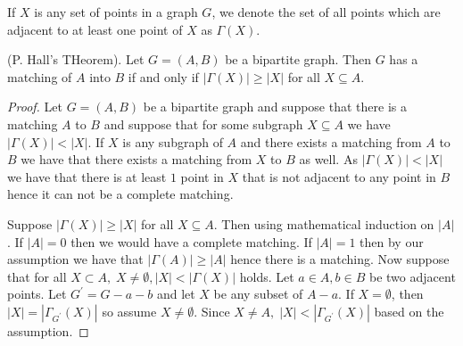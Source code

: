 \documentclass[12pt]{article}
\newenvironment{theorem}[2][Theorem]{\begin{trivlist}
\item[\hskip \labelsep {\bfseries #1}\hskip \labelsep {\bfseries #2.}]}{\end{trivlist}}
\begin{document}
If $X$ is any set of points in a graph $G$, we denote the set of all points which are adjacent to at least one point of $X$ as $\Gamma(X)$.

\begin{theorem}
    {1.1.3.}
    (P. Hall's THeorem). Let $G=(A,B)$ be a bipartite graph. Then $G$ has a matching of $A$ into $B$ if and only if $|\Gamma(X)|\geq |X|$ for all $X \subseteq A$.
\end{theorem}

\begin{proof}

    Let $G=(A,B)$ be a bipartite graph and suppose that there is a matching $A$ to $B$ and suppose that for some subgraph $X \subseteq A$ we have $|\Gamma(X)|<|X|$. If $X$ is any subgraph of $A$ and there exists a matching from $A$ to $B$ we have that there exists a matching from $X$ to $B$ as well. As $|\Gamma(X)|<|X|$ we have that there is at least $1$ point in $X$ that is not adjacent to any point in $B$ hence it can not be a complete matching.

    Suppose $|\Gamma(X)|\geq |X|$ for all $X\subseteq A$. Then using mathematical induction on $|A|$. If $|A|=0$ then we would have a complete matching. If $|A|=1$ then by our assumption we have that $|\Gamma(A)|\geq |A|$ hence there is a matching. Now suppose that for all $X \subset A,\; X\not = \emptyset, |X|< |\Gamma(X)|$ holds. Let $a\in A,b \in B$ be two adjacent points. Let $G^{\prime}= G - a - b$ and let $X$ be any subset of $A-a$. If $X = \emptyset$, then $|X|=|\Gamma_{G^\prime}(X)|$ so assume $X \not = \emptyset$. Since $X\not = A,\; |X|< |\Gamma_{G^\prime}(X)|$ based on the assumption.

\end{proof}
\end{document}

